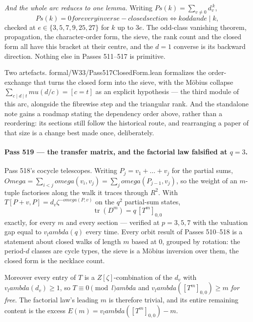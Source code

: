 \documentclass[12pt,a4paper]{article}
\def\mathbb#1{#1}%
\def\mathrm#1{#1}%
\def\texttt#1{#1}%
\def\text#1{#1}%
\def\omega{omega}%
\def\lambda{lambda}%
\def\mu{mu}%
\def\Omega{Omega}%
\theoremstyle{definition}
\newcommand{\ZZ}{\mathbb{Z}}
\begin{document}
\emph{And the whole arc reduces to one lemma.}  Writing
$\mathrm{Ps}(k)=\sum_{v\neq0}d_v^{\,k}$,
\[
\mathrm{Ps}(k)=0 \text{ for every inverse-closed section}
\iff k \text{ odd and } e\mid k,
\]
checked at $e\in\{3,5,7,9,25,27\}$ for $k$ up to $3e$.  The odd-class vanishing
theorem, propagation, the character-order form, the sieve, the rank count and
the closed form all have this bracket at their centre, and the $d=1$ converse is
its backward direction.  Nothing else in Passes 511--517 is primitive.

Two artefacts.  \texttt{formal/W33/Pass517ClosedForm.lean} formalizes the
order-exchange that turns the closed form into the sieve, with the M\"obius
collapse $\sum_{c\mid d\mid t}\mu(d/c)=[c=t]$ as an explicit hypothesis --- the
third module of this arc, alongside the fibrewise step and the triangular rank.
And the standalone note gains a roadmap stating the dependency order above,
rather than a reordering: its sections still follow the historical route, and
rearranging a paper of that size is a change best made once, deliberately.

\paragraph{Pass 519 --- the transfer matrix, and the factorial law falsified at
$q=3$.}
Pass 518's cocycle telescopes.  Writing $P_j=v_1+\dots+v_j$ for the partial
sums, $\Omega=\sum_{i<j}\omega(v_i,v_j)=\sum_j\omega(P_{j-1},v_j)$, so the
weight of an $m$-tuple factorises along the walk it traces through $R^{2}$.
With $T[P+v,P]=d_v\zeta^{-\omega(P,v)}$ on the $q^{2}$ partial-sum states,
\[
\operatorname{tr}(D^m)=q\,[T^m]_{0,0}
\]
exactly, for every $m$ and every section --- verified at $p=3,5,7$ with the
valuation gap equal to $v_\lambda(q)$ every time.  Every orbit result of Passes
510--518 is a statement about closed walks of length $m$ based at $0$, grouped
by rotation: the period-$d$ classes are cycle types, the sieve is a M\"obius
inversion over them, the closed form is the necklace count.

Moreover every entry of $T$ is a $\ZZ[\zeta]$-combination of the $d_v$ with
$v_\lambda(d_v)\ge1$, so $T\equiv0\pmod\lambda$ and
$v_\lambda([T^m]_{0,0})\ge m$ \emph{for free}.  The factorial law's leading $m$
is therefore trivial, and its entire remaining content is the excess
$E(m)=v_\lambda([T^m]_{0,0})-m$.
\end{document}
